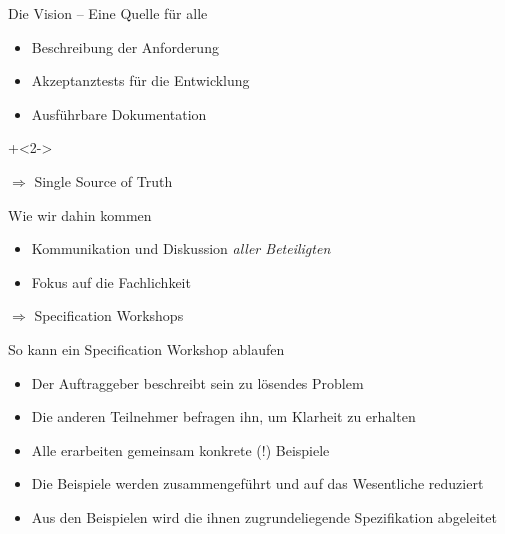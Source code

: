 \begin{frame}{Die Vision -- Eine Quelle für alle}

\begin{itemize}
	\item Beschreibung der Anforderung

	\item Akzeptanztests für die Entwicklung

	\item Ausführbare Dokumentation
\end{itemize}

\vspace{1em}

\onslide+<2->

$\Rightarrow$ Single Source of Truth

\end{frame}


\begin{frame}{Wie wir dahin kommen}


\begin{itemize}
	\item Kommunikation und Diskussion \em aller \em Beteiligten 
	
	\item Fokus auf die Fachlichkeit
\end{itemize}


\vspace{1em}

$\Rightarrow$ Specification Workshops

\end{frame}


\begin{frame}{So kann ein Specification Workshop ablaufen}

\begin{itemize}
	\item Der Auftraggeber beschreibt sein zu lösendes Problem
	\item Die anderen Teilnehmer befragen ihn, um Klarheit zu erhalten
	\item Alle erarbeiten gemeinsam konkrete (!) Beispiele
	\item Die Beispiele werden zusammengeführt und auf das Wesentliche reduziert
	\item Aus den Beispielen wird die ihnen zugrundeliegende Spezifikation abgeleitet
\end{itemize}

\end{frame}


